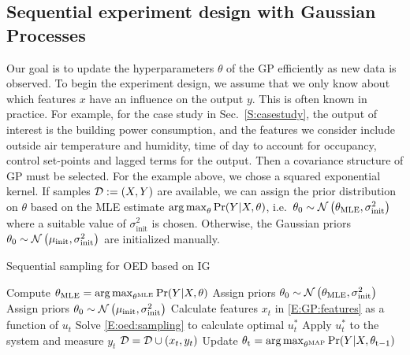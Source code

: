 \subsection{Sequential experiment design with Gaussian Processes}
\label{SS:oed:sequential}

Our goal is to update the hyperparameters \(\theta\) of the GP efficiently as new data is observed. 
To begin the experiment design, we assume that we only know about which features \(x\) have an influence on the output \(y\). This is often known in practice. For example, for the case study in Sec.~\ref{S:casestudy}, the output of interest is the building power consumption, and the features we consider include outside air temperature and humidity, time of day to account for occupancy, control set-points and lagged terms for the output. Then a covariance structure of GP must be selected. For the example above, we chose a squared exponential kernel.
If samples \(\mathcal{D} := (X,Y)\) are available, we can assign the prior distribution on \(\theta\) based on the MLE estimate \( \operatorname*{arg\,max}_\theta \Pr(Y \vert X, \theta)\), i.e.~\(\theta_{\mathrm{0}} \sim \operatorname*{\mathcal{N}}\left(\theta_{\mathrm{MLE}}, \sigma^2_{\mathrm{init}}\right)\) where a suitable value of \(\sigma^2_{\mathrm{init}}\) is chosen.
Otherwise, the Gaussian priors \(\theta_{\mathrm{0}} \sim \operatorname*{\mathcal{N}}\left(\mu_{\mathrm{{init}}}, \sigma^2_\mathrm{init}\right)\) are initialized manually.

\begin{algorithm}[!tb]
	\caption{Sequential sampling for OED based on IG}
	\label{A:oed:sequential}
	\begin{algorithmic}[1]
		\State Compute \( \theta_{\mathrm{MLE}} = \operatorname*{arg\,max}_{\theta^{\mathrm{MLE}}} \Pr(Y \vert X, \theta)\)
		\State Assign priors \(\theta_{\mathrm{0}} \sim \operatorname*{\mathcal{N}}\left(\theta_{\mathrm{MLE}}, \sigma^2_{\mathrm{init}}\right)\)
		\Else 
		\State Assign priors \(\theta_{\mathrm{0}} \sim \operatorname*{\mathcal{N}}\left(\mu_{\mathrm{{init}}}, \sigma^2_\mathrm{init}\right)\)
		\EndIf
		\EndProcedure
		\State Calculate features \(x_t\) in \eqref{E:GP:features} as a function of \(u_t\)
		\State Solve \eqref{E:oed:sampling} to calculate optimal \(u^*_t\)
		\State Apply \(u^*_t\) to the system and measure \(y_t\)
		\State \(\mathcal{D} = \mathcal{D} \cup (x_t,y_t) \)
		\State Update \( \theta_{\mathrm{t}} = \operatorname*{arg\,max}_{\theta^{\mathrm{MAP}}} \Pr(Y \vert X, \theta_{\mathrm{t-1}})\)
		\EndWhile
		\EndProcedure
      \end{algorithmic}
\end{algorithm}


